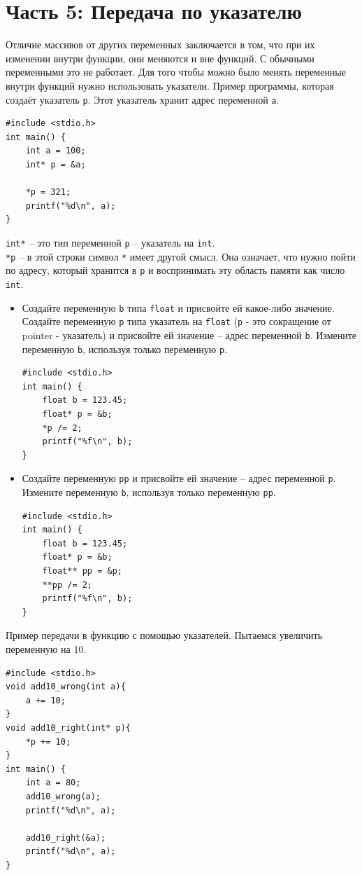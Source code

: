 \documentclass{article}
\begin{document}
\section*{Часть 5: Передача по указателю}
Отличие массивов от других переменных заключается в том, что при их изменении внутри функции, они меняются и вне функций. С обычными переменными это не работает. Для того чтобы можно было менять переменные внутри функций нужно использовать указатели.
Пример программы, которая создаёт указатель \texttt{p}. Этот указатель хранит адрес переменной \texttt{a}.
\begin{lstlisting}
#include <stdio.h>
int main() {
    int a = 100;
    int* p = &a;
	
    *p = 321;
    printf("%d\n", a);     
}
\end{lstlisting}
\texttt{int*} -- это тип переменной \texttt{p} -- указатель на \texttt{int}. \\
\texttt{*p} -- в этой строки символ \texttt{*} имеет другой смысл. Она означает, что нужно пойти по адресу, который хранится в \texttt{p} и воспринимать эту область памяти как число \texttt{int}.

\begin{itemize}
\item Создайте переменную \texttt{b} типа \texttt{float} и присвойте ей какое-либо значение. Создайте переменную \texttt{p} типа указатель на \texttt{float} (\texttt{p} - это сокращение от pointer - указатель)  и присвойте ей значение -- адрес переменной \texttt{b}. Измените переменную \texttt{b}, используя только переменную \texttt{p}.
\begin{lstlisting}[backgroundcolor = \color{solcolor}]
#include <stdio.h>
int main() {
    float b = 123.45;
    float* p = &b;
    *p /= 2;
    printf("%f\n", b);
}
\end{lstlisting}
\item Создайте переменную \texttt{pp} и присвойте ей значение -- адрес переменной \texttt{p}. Измените переменную \texttt{b}, используя только переменную \texttt{pp}.
\begin{lstlisting}[backgroundcolor = \color{solcolor}]
#include <stdio.h>
int main() {
    float b = 123.45;
    float* p = &b;
    float** pp = &p;
    **pp /= 2;
    printf("%f\n", b);
}
\end{lstlisting}
\end{itemize}

\newpage
Пример передачи в функцию с помощью указателей. Пытаемся увеличить переменную на 10.
\begin{lstlisting}
#include <stdio.h>
void add10_wrong(int a){
    a += 10;
}
void add10_right(int* p){
    *p += 10;
}
int main() {
    int a = 80;
    add10_wrong(a);
    printf("%d\n", a); 
	    
    add10_right(&a);
    printf("%d\n", a); 
}
\end{lstlisting}
\end{document}
